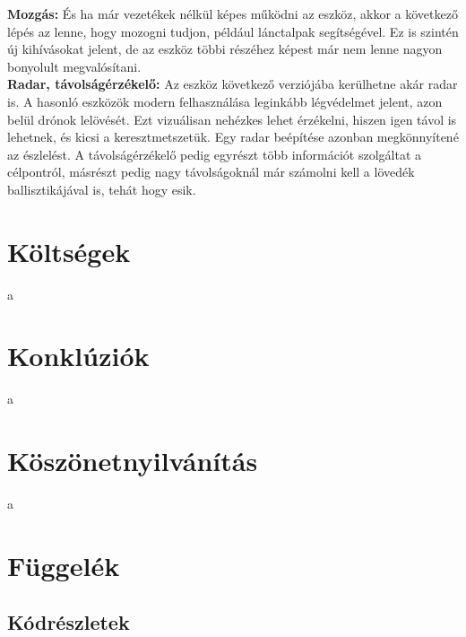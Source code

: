 \documentclass[12pt,a4paper]{article}
\begin{document}
\textbf{Mozgás:} És ha már vezetékek nélkül képes működni az eszköz, akkor a következő lépés az lenne, hogy mozogni tudjon, például lánctalpak segítségével. Ez is szintén új kihívásokat jelent, de az eszköz többi részéhez képest már nem lenne nagyon bonyolult megvalósítani.\\

\textbf{Radar, távolságérzékelő:} Az eszköz következő verziójába kerülhetne akár radar is. A hasonló eszközök modern felhasználása leginkább légvédelmet jelent, azon belül drónok lelövését. Ezt vizuálisan nehézkes lehet érzékelni, hiszen igen távol is lehetnek, és kicsi a keresztmetszetük. Egy radar beépítése azonban megkönnyítené az észlelést. A távolságérzékelő pedig egyrészt több információt szolgáltat a célpontról, másrészt pedig nagy távolságoknál már számolni kell a lövedék ballisztikájával is, tehát hogy esik. 
\section{Költségek}
a
\section{Konklúziók}
a
\section{Köszönetnyilvánítás}
a
\pagebreak

\section*{Függelék}
\subsection*{Kódrészletek}
\end{document}
